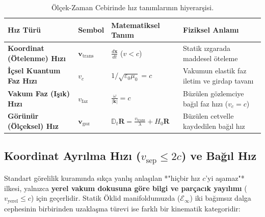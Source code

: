 \documentclass[11pt,a4paper]{article}
\begin{document}
\begin{table}[h!]
    \centering
    \small
    \begin{tabular}{@{}llll@{}}
        \toprule
        \textbf{Hız Türü}                  & \textbf{Sembol}               & \textbf{Matematiksel Tanım}                                                     & \textbf{Fiziksel Anlamı}                      \\ \midrule
        \textbf{Koordinat (Ötelenme) Hızı} & $\mathbf{v}_{\mathrm{trans}}$ & $\frac{d\mathbf{x}}{dt}$ ($v < c$)                                              & Statik ızgarada maddesel öteleme              \\
        \textbf{İçsel Kuantum Faz Hızı}    & $v_c$                         & $1/\sqrt{\varepsilon_0\mu_0} = c$                                               & Vakumun elastik faz iletim ve girdap tavanı   \\
        \textbf{Vakum Faz (Işık) Hızı}     & $v_{\mathrm{faz}}$            & $\frac{\omega}{|\mathbf{k}|} = c$                                               & Büzülen gözlemciye bağıl faz hızı ($v_c = c$) \\
        \textbf{Görünür (Ölçeksel) Hız}    & $\mathbf{v}_{\mathrm{goz}}$   & $\mathbb{D}_t \mathbf{R} = \frac{v_{\mathrm{trans}}}{\lambda} + H_0 \mathbf{R}$ & Büzülen cetvelle kaydedilen bağıl hız         \\ \bottomrule
    \end{tabular}
    \caption{Ölçek-Zaman Cebirinde hız tanımlarının hiyerarşisi.}
    \label{tab:hiz_hiyerarsisi}
\end{table}

\subsection{Koordinat Ayrılma Hızı (\texorpdfstring{$v_{\mathrm{sep}} \le 2c$}{vsep <= 2c}) ve Bağıl Hız}
\label{sec:ayrilma_hizi}

Standart görelilik kuramında sıkça yanlış anlaşılan *"hiçbir hız $c$'yi aşamaz"* ilkesi, yalnızca \textbf{yerel vakum dokusuna göre bilgi ve parçacık yayılımı} ($v_{\mathrm{yerel}} \le c$) için geçerlidir. Statik Öklid manifoldumuzda ($\mathcal{E}_\infty$) iki bağımsız dalga cephesinin birbirinden uzaklaşma türevi ise farklı bir kinematik kategoridir:
\end{document}
